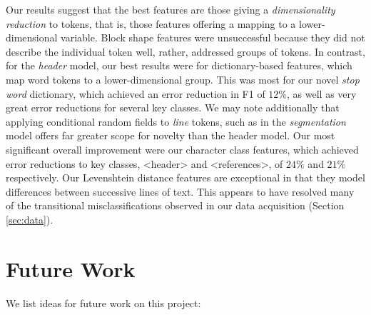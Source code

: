 Our results suggest that the best features are those giving a \emph{dimensionality reduction} to tokens, that is, those features offering a mapping to a lower-dimensional variable. Block shape features were unsuccessful because they did not describe the individual token well, rather, addressed groups of tokens. In contrast, for the \emph{header} model, our best results were for dictionary-based features, which map word tokens to a lower-dimensional group. This was most  for our novel \emph{stop word} dictionary, which achieved an error reduction in F1 of $12\%$, as well as very great error reductions for several key classes. We may note additionally that applying conditional random fields to \emph{line} tokens, such as in the \emph{segmentation} model offers far greater scope for novelty than the header model. Our most significant overall improvement were our character class features, which achieved error reductions to key classes, <header> and <references>, of $24\%$ and $21\%$ respectively. Our Levenshtein distance features are exceptional in that they model differences between successive lines of text. This appears to have resolved many of the transitional misclassifications observed in our data acquisition (Section \ref{sec:data}).

\section{Future Work}
\label{sec:futurework}

We list ideas for future work on this project:

